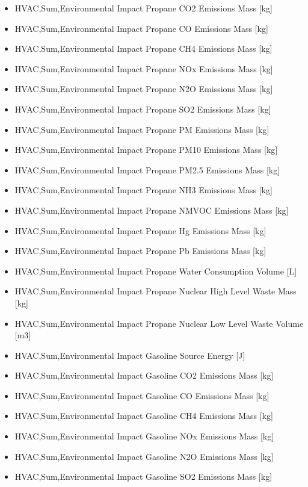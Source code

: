 \begin{itemize}
\item
  HVAC,Sum,Environmental Impact Propane CO2 Emissions Mass {[}kg{]}
\item
  HVAC,Sum,Environmental Impact Propane CO Emissions Mass {[}kg{]}
\item
  HVAC,Sum,Environmental Impact Propane CH4 Emissions Mass {[}kg{]}
\item
  HVAC,Sum,Environmental Impact Propane NOx Emissions Mass {[}kg{]}
\item
  HVAC,Sum,Environmental Impact Propane N2O Emissions Mass {[}kg{]}
\item
  HVAC,Sum,Environmental Impact Propane SO2 Emissions Mass {[}kg{]}
\item
  HVAC,Sum,Environmental Impact Propane PM Emissions Mass {[}kg{]}
\item
  HVAC,Sum,Environmental Impact Propane PM10 Emissions Mass {[}kg{]}
\item
  HVAC,Sum,Environmental Impact Propane PM2.5 Emissions Mass {[}kg{]}
\item
  HVAC,Sum,Environmental Impact Propane NH3 Emissions Mass {[}kg{]}
\item
  HVAC,Sum,Environmental Impact Propane NMVOC Emissions Mass {[}kg{]}
\item
  HVAC,Sum,Environmental Impact Propane Hg Emissions Mass {[}kg{]}
\item
  HVAC,Sum,Environmental Impact Propane Pb Emissions Mass {[}kg{]}
\item
  HVAC,Sum,Environmental Impact Propane Water Consumption Volume {[}L{]}
\item
  HVAC,Sum,Environmental Impact Propane Nuclear High Level Waste Mass {[}kg{]}
\item
  HVAC,Sum,Environmental Impact Propane Nuclear Low Level Waste Volume {[}m3{]}
\item
  HVAC,Sum,Environmental Impact Gasoline Source Energy {[}J{]}
\item
  HVAC,Sum,Environmental Impact Gasoline CO2 Emissions Mass {[}kg{]}
\item
  HVAC,Sum,Environmental Impact Gasoline CO Emissions Mass {[}kg{]}
\item
  HVAC,Sum,Environmental Impact Gasoline CH4 Emissions Mass {[}kg{]}
\item
  HVAC,Sum,Environmental Impact Gasoline NOx Emissions Mass {[}kg{]}
\item
  HVAC,Sum,Environmental Impact Gasoline N2O Emissions Mass {[}kg{]}
\item
  HVAC,Sum,Environmental Impact Gasoline SO2 Emissions Mass {[}kg{]}

\end{itemize}
